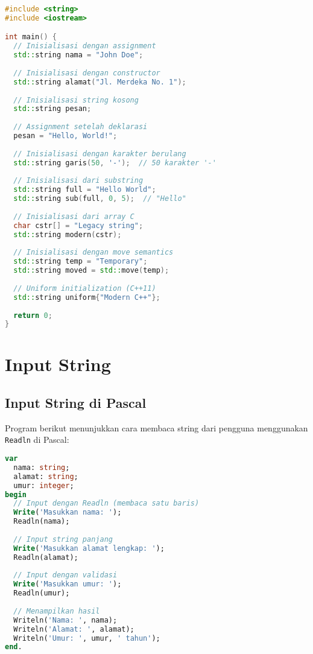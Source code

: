 \documentclass[../main.tex]{subfiles}
\begin{document}
\begin{lstlisting}[language=C++, caption={Inisialisasi string di C++}]
#include <string>
#include <iostream>

int main() {
  // Inisialisasi dengan assignment
  std::string nama = "John Doe";
  
  // Inisialisasi dengan constructor
  std::string alamat("Jl. Merdeka No. 1");
  
  // Inisialisasi string kosong
  std::string pesan;
  
  // Assignment setelah deklarasi
  pesan = "Hello, World!";
  
  // Inisialisasi dengan karakter berulang
  std::string garis(50, '-');  // 50 karakter '-'
  
  // Inisialisasi dari substring
  std::string full = "Hello World";
  std::string sub(full, 0, 5);  // "Hello"
  
  // Inisialisasi dari array C
  char cstr[] = "Legacy string";
  std::string modern(cstr);
  
  // Inisialisasi dengan move semantics
  std::string temp = "Temporary";
  std::string moved = std::move(temp);
  
  // Uniform initialization (C++11)
  std::string uniform{"Modern C++"};
  
  return 0;
}
\end{lstlisting}

\section{Input String}

\subsection{Input String di Pascal}

Program berikut menunjukkan cara membaca string dari pengguna menggunakan \texttt{Readln} di Pascal:

\begin{lstlisting}[language=Pascal, caption={Input string di Pascal}]
var
  nama: string;
  alamat: string;
  umur: integer;
begin
  // Input dengan Readln (membaca satu baris)
  Write('Masukkan nama: ');
  Readln(nama);
  
  // Input string panjang
  Write('Masukkan alamat lengkap: ');
  Readln(alamat);
  
  // Input dengan validasi
  Write('Masukkan umur: ');
  Readln(umur);
  
  // Menampilkan hasil
  Writeln('Nama: ', nama);
  Writeln('Alamat: ', alamat);
  Writeln('Umur: ', umur, ' tahun');
end.
\end{lstlisting}
\end{document}

